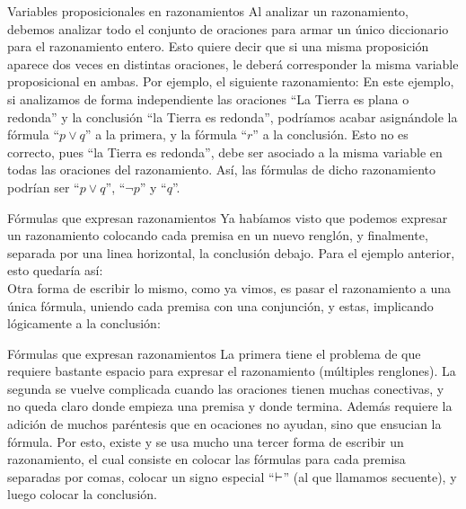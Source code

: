 
\begin{frame}{Variables proposicionales en razonamientos}
  Al analizar un razonamiento, debemos analizar todo el conjunto de oraciones
  para armar un único diccionario para el razonamiento entero.
  \jump
  Esto quiere decir que si una misma proposición aparece dos veces en distintas
  oraciones, le deberá corresponder la misma variable proposicional en ambas.
  \jump
  Por ejemplo, el siguiente razonamiento: 
  \jump
  En este ejemplo, si analizamos de forma independiente las oraciones ``La Tierra es plana o
  redonda'' y la conclusión ``la Tierra es redonda'', podríamos acabar asignándole
  la fórmula ``$p \lor q$'' a la primera, y la fórmula ``$r$'' a la conclusión.
  Esto no es correcto, pues ``la Tierra es redonda'', debe ser asociado a la misma
  variable en todas las oraciones del razonamiento.
  \jump
  Así, las fórmulas de dicho razonamiento podrían ser ``$p \lor q$'', ``$\lnot p$''
  y ``$q$''.
\end{frame}


\begin{frame}{Fórmulas que expresan razonamientos}
  Ya habíamos visto que podemos expresar un razonamiento colocando
  cada premisa en un nuevo renglón, y finalmente, separada por una
  linea horizontal, la conclusión debajo.
  \jump
  Para el ejemplo anterior, esto quedaría así:\\
  \jump
  \jump
  Otra forma de escribir lo mismo, como ya vimos, es pasar el razonamiento a
  una única fórmula, uniendo cada premisa con una conjunción, y estas, implicando
  lógicamente a la conclusión:\\
\end{frame}


\begin{frame}{Fórmulas que expresan razonamientos}
  La primera tiene el problema de que requiere bastante espacio para expresar
  el razonamiento (múltiples renglones).
  \jump
  La segunda se vuelve complicada cuando las oraciones tienen muchas conectivas,
  y no queda claro donde empieza una premisa y donde termina. Además requiere la
  adición de muchos paréntesis que en ocaciones no ayudan, sino que ensucian
  la fórmula.
  \jump
  Por esto, existe y se usa mucho una tercer forma de escribir un razonamiento,
  el cual consiste en colocar las fórmulas para cada premisa separadas por comas,
  colocar un signo especial ``$\vdash$'' (al que llamamos secuente), y luego
  colocar la conclusión.
  \jump
\end{frame}


